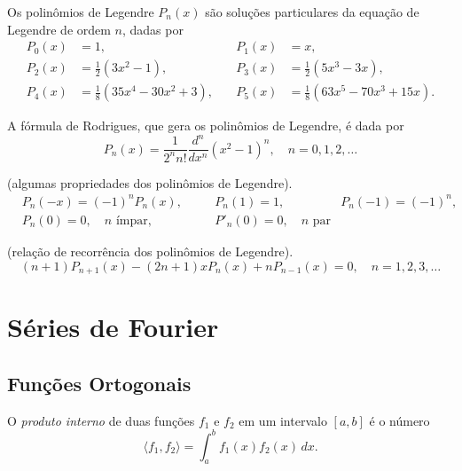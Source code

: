 \documentclass{article}
\begin{document}
\begin{prop}
    Os polinômios de Legendre \(P_n(x)\) são soluções particulares da equação de Legendre de ordem \(n\), dadas por
    \begin{align*}
        P_0(x) &= 1, & \quad P_1(x) &= x,\\
        P_2(x) &= \frac{1}{2}(3x^2 - 1), & \quad P_3(x) &= \frac{1}{2}(5x^3 - 3x),\\
        P_4(x) &= \frac{1}{8}(35x^4 - 30x^2 + 3), & \quad P_5(x) &= \frac{1}{8}(63x^5 - 70x^3 + 15x). 
    \end{align*}

    \noindent A fórmula de Rodrigues, que gera os polinômios de Legendre, é dada por
    \begin{equation}\label{eq:rodrigues}
        P_n(x) = \frac{1}{2^n n!} \frac{d^n}{dx^n} (x^2 - 1)^n, \quad n=0,1,2,\ldots
    \end{equation}
\end{prop}

\begin{prop} (algumas propriedades dos polinômios de Legendre).
    \begin{align*}
        &P_n(-x) = (-1)^n P_n(x), &\quad & P_n(1) = 1, \quad & P_n(-1) = (-1)^n, \\
        &P_n(0) = 0, \quad n \text{ ímpar}, &\quad & P'_n(0) = 0, \quad n \text{ par} &
    \end{align*}
\end{prop}

\begin{prop} (relação de recorrência dos polinômios de Legendre).
    \begin{equation}\label{eq:recorrencia-legendre}
        (n+1)P_{n+1}(x) - (2n+1)xP_n(x) + nP_{n-1}(x) = 0, \quad n=1,2,3,\ldots
    \end{equation}
\end{prop}

\section{Séries de Fourier}

\subsection{Funções Ortogonais}

\begin{defn} 
    O \emph{produto interno} de duas funções \(f_1\) e \(f_2\) em um intervalo \([a,b]\) é o número
    \begin{equation}
        \langle f_1, f_2 \rangle = \int_a^b f_1(x)f_2(x) \, dx.
    \end{equation}
\end{defn}
\end{document}
